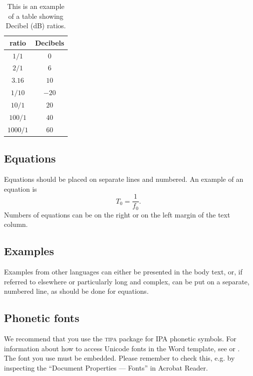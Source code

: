 \documentclass[a4paper,11pt,twocolumn]{article}
\begin{document}
\begin{table}[!ht]
\begin{center}
\begin{tabular}{|c|c|}
\hline
\rowcolor[gray]{.75}
ratio    & Decibels\\
\hline
$1/1$    & $0$\\
$2/1$    & $6$\\
$3.16$   & $10$\\
$1/10$   & $-20$\\
$10/1$   & $20$\\
$100/1$  & $40$\\
$1000/1$ & $60$\\
\hline
\end{tabular}
\caption{This is an example of a table showing Decibel (dB)
ratios.}\label{tab:decibel}
\end{center}
\end{table}


\subsection{Equations}

Equations should be placed on separate lines and numbered. An example
of an equation is
\begin{equation}\label{eq:tzero}
T_0 = \frac{1}{f_0}.
\end{equation}
Numbers of equations can be on the right or on the left margin of the
text column.

\subsection{Examples}

Examples from other languages can either be presented in the body text, or, if referred to elsewhere or particularly long and complex, can be put on a separate, numbered line, as should be done for equations.


\subsection{Phonetic fonts}

We recommend that you use the \textsc{tipa} package for IPA phonetic symbols. For information about how to access Unicode fonts in the Word template, see \cite{IPA-SIL} or \cite{IPA-KEYBOARD}. The font you use must be embedded. Please remember to check this,  e.g. by inspecting the ``Document Properties --- Fonts'' in Acrobat Reader.
\end{document}
